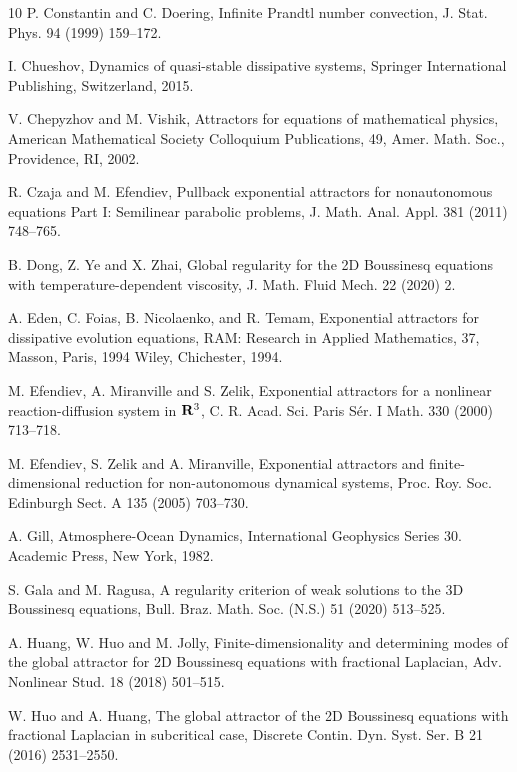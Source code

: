 \documentclass[oneside,preprint,12pt,numbers,sort&compress]{elsarticle}
\begin{document}
\begin{thebibliography}{10}
P. Constantin and C. Doering, Infinite Prandtl number convection, J. Stat. Phys. 94 (1999) 159–172.

I. Chueshov, Dynamics of quasi-stable dissipative systems, Springer International Publishing, Switzerland, 2015.%

V. Chepyzhov and M. Vishik, Attractors for equations of mathematical physics, American Mathematical Society Colloquium Publications, 49, Amer. Math. Soc., Providence, RI, 2002. %

R. Czaja and M. Efendiev, Pullback exponential attractors for nonautonomous equations Part I: Semilinear parabolic problems, J. Math. Anal. Appl. 381 (2011) 748--765.%

B. Dong, Z. Ye and X. Zhai, Global regularity for the 2D Boussinesq equations with temperature-dependent viscosity, J. Math. Fluid Mech. 22 (2020) 2.%

A. Eden, C. Foias, B. Nicolaenko, and R. Temam, Exponential attractors for dissipative evolution equations, RAM: Research in Applied Mathematics, 37, Masson, Paris, 1994 Wiley, Chichester, 1994.%

M. Efendiev, A. Miranville and S. Zelik, Exponential attractors for a nonlinear reaction-diffusion system in ${\bf R}^3$, C. R. Acad. Sci. Paris S\'er. I Math. 330 (2000) 713--718.%

M. Efendiev, S. Zelik and A. Miranville, Exponential attractors and finite-dimensional reduction for non-autonomous dynamical systems, Proc. Roy. Soc. Edinburgh Sect. A 135 (2005) 703--730.%

A. Gill, Atmosphere-Ocean Dynamics, International Geophysics Series 30. Academic Press, New York, 1982.

S. Gala and M. Ragusa, A regularity criterion of weak solutions to the 3D Boussinesq equations, Bull. Braz. Math. Soc. (N.S.) 51 (2020) 513--525.%

A. Huang, W. Huo and M. Jolly, Finite-dimensionality and determining modes of the global attractor for 2D Boussinesq equations with fractional Laplacian, Adv. Nonlinear Stud. 18 (2018) 501--515.%

W. Huo and A. Huang, The global attractor of the 2D Boussinesq equations with fractional Laplacian in subcritical case, Discrete Contin. Dyn. Syst. Ser. B 21 (2016) 2531--2550.%


\end{thebibliography}
\end{document}
